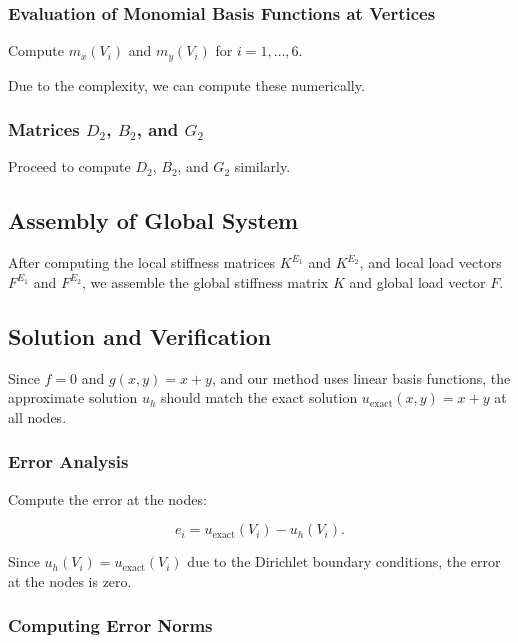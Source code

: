 \documentclass[class=article, crop=false]{standalone}
\begin{document}
\subsubsection{Evaluation of Monomial Basis Functions at Vertices}

Compute \( m_x(V_i) \) and \( m_y(V_i) \) for \( i = 1, \dots, 6 \).

Due to the complexity, we can compute these numerically.

\subsubsection{Matrices \( D_2 \), \( B_2 \), and \( G_2 \)}

Proceed to compute \( D_2 \), \( B_2 \), and \( G_2 \) similarly.

\subsection{Assembly of Global System}

After computing the local stiffness matrices \( K^{E_1} \) and \( K^{E_2} \), and local load vectors \( F^{E_1} \) and \( F^{E_2} \), we assemble the global stiffness matrix \( K \) and global load vector \( F \).

\subsection{Solution and Verification}

Since \( f = 0 \) and \( g(x, y) = x + y \), and our method uses linear basis functions, the approximate solution \( u_h \) should match the exact solution \( u_{\text{exact}}(x, y) = x + y \) at all nodes.

\subsubsection{Error Analysis}

Compute the error at the nodes:

\[
e_i = u_{\text{exact}}(V_i) - u_h(V_i).
\]

Since \( u_h(V_i) = u_{\text{exact}}(V_i) \) due to the Dirichlet boundary conditions, the error at the nodes is zero.

\subsubsection{Computing Error Norms}
\end{document}
